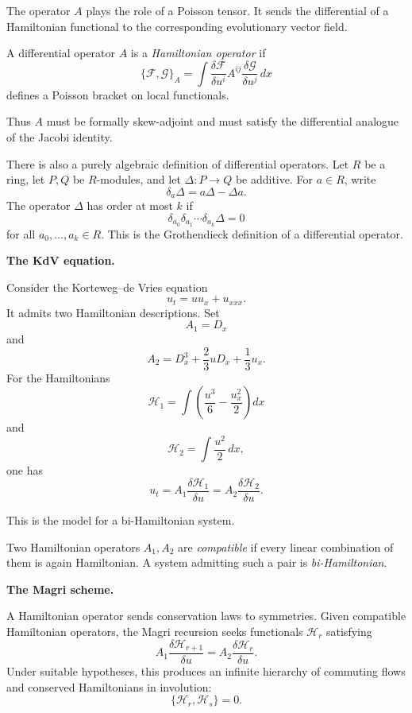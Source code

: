 The operator $A$ plays the role of a
Poisson tensor. It sends the differential
of a Hamiltonian functional to the
corresponding evolutionary vector field.

\begin{definition}
\label{definition-hamiltonian-operator}
A differential operator $A$ is a
\textit{Hamiltonian operator} if
$$
\{\mathcal{F},\mathcal{G}\}_A
=
\int
\frac{\delta\mathcal{F}}{\delta u^i}
A^{ij}
\frac{\delta\mathcal{G}}{\delta u^j}
\,dx
$$
defines a Poisson bracket on local
functionals.
\end{definition}

Thus $A$ must be formally skew-adjoint and
must satisfy the differential analogue of
the Jacobi identity.

There is also a purely algebraic definition
of differential operators. Let $R$ be a
ring, let $P,Q$ be $R$-modules, and let
$\Delta:P\to Q$ be additive. For $a\in R$,
write
$$
\delta_a\Delta=a\Delta-\Delta a.
$$
The operator $\Delta$ has order at most
$k$ if
$$
\delta_{a_0}\delta_{a_1}\cdots
\delta_{a_k}\Delta=0
$$
for all $a_0,\ldots,a_k\in R$. This is the
Grothendieck definition of a differential
operator.

\medskip\noindent
{\bf The KdV equation.}

\begin{example}
\label{example-kdv-bihamiltonian}
Consider the Korteweg--de Vries equation
$$
u_t=uu_x+u_{xxx}.
$$
It admits two Hamiltonian descriptions.
Set
$$
A_1=D_x
$$
and
$$
A_2=D_x^3+\frac{2}{3}uD_x
+\frac{1}{3}u_x.
$$
For the Hamiltonians
$$
\mathcal{H}_1=
\int\left(
\frac{u^3}{6}-\frac{u_x^2}{2}
\right)dx
$$
and
$$
\mathcal{H}_2=\int\frac{u^2}{2}\,dx,
$$
one has
$$
u_t=A_1
\frac{\delta\mathcal{H}_1}{\delta u}
=A_2
\frac{\delta\mathcal{H}_2}{\delta u}.
$$
\end{example}

This is the model for a bi-Hamiltonian
system.

\begin{definition}
\label{definition-compatible-hamiltonian}
Two Hamiltonian operators $A_1,A_2$ are
\textit{compatible} if every linear
combination of them is again Hamiltonian.
A system admitting such a pair is
\textit{bi-Hamiltonian}.
\end{definition}

\medskip\noindent
{\bf The Magri scheme.}

A Hamiltonian operator sends conservation
laws to symmetries. Given compatible
Hamiltonian operators, the Magri recursion
seeks functionals $\mathcal{H}_r$ satisfying
$$
A_1
\frac{\delta\mathcal{H}_{r+1}}{\delta u}
=
A_2
\frac{\delta\mathcal{H}_r}{\delta u}.
$$
Under suitable hypotheses, this produces
an infinite hierarchy of commuting flows
and conserved Hamiltonians in involution:
$$
\{\mathcal{H}_r,\mathcal{H}_s\}=0.
$$

